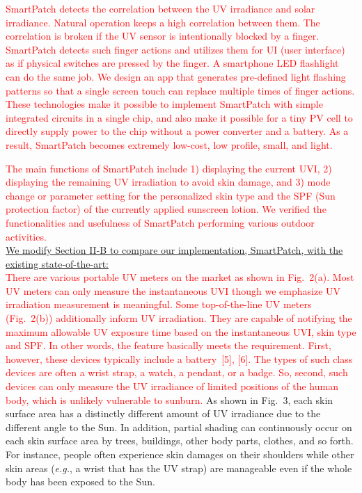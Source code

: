 \documentclass[onecolumn]{IEEEconf}
\begin{document}
\begin{description}
\textcolor{red}{SmartPatch detects the correlation between the UV irradiance and solar irradiance. Natural operation keeps a high correlation between them. The correlation is broken if the UV sensor is intentionally blocked by a finger. SmartPatch detects such finger actions and utilizes them for UI (user interface) as if physical switches are pressed by the finger. A smartphone LED flashlight can do the same job. We design an app that  generates pre-defined light flashing patterns so that a single screen touch can replace multiple times of finger actions. These technologies make it possible to implement SmartPatch with simple integrated circuits in a single chip, and also make it possible for a tiny PV cell to directly supply power to the chip without a power converter and a battery. As a result, SmartPatch becomes extremely low-cost, low profile, small, and light.}

 \textcolor{red}{The main functions of SmartPatch include 1) displaying the current UVI, 2) displaying the remaining UV irradiation to avoid skin damage, and 3) mode change or parameter setting for the personalized skin type and the SPF (Sun protection factor) of the currently applied sunscreen lotion. We verified the functionalities and usefulness of SmartPatch performing various outdoor activities.}\\

\underline{We modify Section II-B to compare our implementation, SmartPatch, with the existing state-of-the-art:}\\
\textcolor{red}{There are various portable UV meters on the market as shown in Fig.~2(a). Most UV meters can only measure the instantaneous UVI though we emphasize UV irradiation measurement is meaningful. Some top-of-the-line UV meters (Fig.~2(b)) additionally inform UV irradiation. They are capable of notifying the maximum allowable UV exposure time based on the instantaneous UVI, skin type and SPF. In other words, the feature basically meets the requirement.  First, however, these devices typically include a battery~[5], [6]. The types of such class devices are often a wrist strap, a watch, a pendant, or a badge. So, second, such devices can only measure the UV irradiance of limited positions of the human body, which is unlikely vulnerable to sunburn.} 
%
As shown in Fig.~3, each skin surface area has a distinctly different amount of UV irradiance due to the different angle to the Sun. In addition, partial shading can continuously occur on each skin surface area by trees, buildings, other body parts, clothes, and so forth. For instance, people often experience skin damages on their shoulders while other skin areas (\textit{e.g.}, a wrist that has the UV strap) are manageable even if the whole body has been exposed to the Sun.


\end{description}
\end{document}
